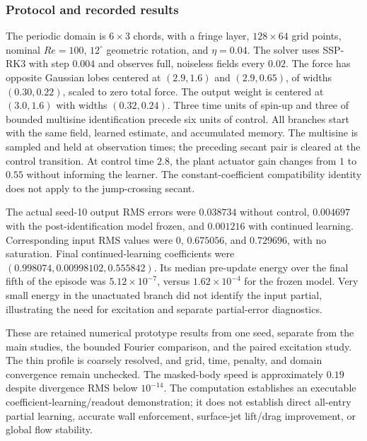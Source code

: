 \subsubsection{Protocol and recorded results}
The periodic domain is $6\times3$ chords, with a fringe layer, $128\times64$
grid points, nominal $Re=100$, $12^\circ$ geometric rotation, and
$\eta=0.04$. The solver uses SSP-RK3 with step $0.004$ and observes full,
noiseless fields every $0.02$. The force has opposite Gaussian lobes centered
at $(2.9,1.6)$ and $(2.9,0.65)$, of widths $(0.30,0.22)$, scaled to zero
total force. The output weight is centered at $(3.0,1.6)$ with widths
$(0.32,0.24)$. Three time units of spin-up and three of bounded multisine
identification precede six units of control. All branches start with the
same field, learned estimate, and accumulated memory. The multisine is
sampled and held at observation times; the preceding secant pair is cleared
at the control transition. At control time $2.8$, the plant actuator
gain changes from $1$ to $0.55$ without informing the learner. The
constant-coefficient compatibility identity does not apply to the
jump-crossing secant.

The actual seed-10 output RMS errors were $0.038734$ without control,
$0.004697$ with the post-identification model frozen, and $0.001216$ with
continued learning. Corresponding input RMS values were $0$, $0.675056$,
and $0.729696$, with no saturation. Final continued-learning coefficients
were $(0.998074,0.00998102,0.555842)$. Its median pre-update energy over the
final fifth of the episode was $5.12\times10^{-7}$, versus
$1.62\times10^{-4}$ for the frozen model. Very small energy in the
unactuated branch did not identify the input partial, illustrating the
need for excitation and separate partial-error diagnostics.

These are retained numerical prototype results from one seed, separate
from the main studies, the bounded Fourier comparison, and the paired
excitation study. The thin profile
is coarsely resolved, and grid, time, penalty, and domain convergence remain
unchecked. The masked-body speed is approximately $0.19$ despite divergence
RMS below $10^{-14}$. The computation establishes an executable
coefficient-learning/readout demonstration; it does not establish
direct all-entry partial learning, accurate wall
enforcement, surface-jet lift/drag improvement, or global flow stability.
